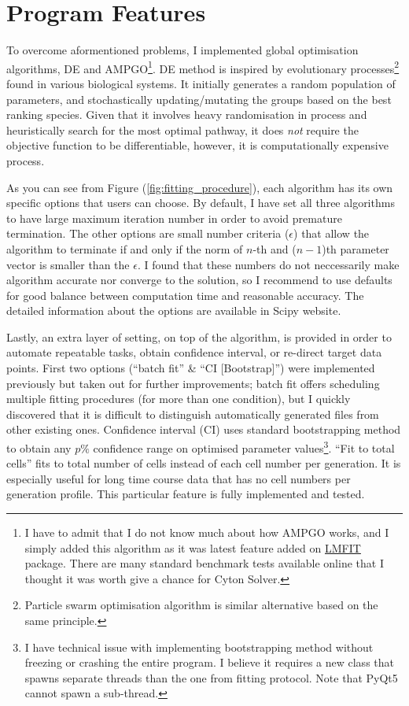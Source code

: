 \documentclass{article}
\newcommand{\enterProblemHeader}[1]{
    }
\newcommand{\exitProblemHeader}[1]{
    }
\newcounter{homeworkProblemCounter} %
\newcommand{\homeworkProblemName}{}
\newenvironment{homeworkProblem}[1][Problem \arabic{homeworkProblemCounter}]{ %
    \stepcounter{homeworkProblemCounter} %
    \renewcommand{\homeworkProblemName}{#1} %
    \section{\homeworkProblemName} %
    \enterProblemHeader{\homeworkProblemName} %
    }{
    \exitProblemHeader{\homeworkProblemName} %
    }
\begin{document}
\begin{homeworkProblem}[Program Features]
        To overcome aformentioned problems, I implemented global optimisation algorithms, DE and AMPGO\footnote{I have to admit that I do not know much about how AMPGO works, and I simply added this algorithm as it was latest feature added on \href{https://lmfit.github.io/lmfit-py/}{LMFIT} package. There are many standard benchmark tests available online that I thought it was worth give a chance for Cyton Solver.}. DE method is inspired by evolutionary processes\footnote{Particle swarm optimisation algorithm is similar alternative based on the same principle.} found in various biological systems. It initially generates a random population of parameters, and stochastically updating/mutating the groups based on the best ranking species. Given that it involves heavy randomisation in process and heuristically search for the most optimal pathway, it does \textit{not} require the objective function to be differentiable, however, it is computationally expensive process.

        As you can see from Figure (\ref{fig:fitting_procedure}), each algorithm has its own specific options that users can choose. By default, I have set all three algorithms to have large maximum iteration number in order to avoid premature termination. The other options are small number criteria ($\epsilon$) that allow the algorithm to terminate if and only if the norm of $n$-th and ($n-1$)th parameter vector is smaller than the $\epsilon$. I found that these numbers do not neccessarily make algorithm accurate nor converge to the solution, so I recommend to use defaults for good balance between computation time and reasonable accuracy. The detailed information about the options are available in Scipy website.

        Lastly, an extra layer of setting, on top of the algorithm, is provided in order to automate repeatable tasks, obtain confidence interval, or re-direct target data points. First two options (``batch fit'' \& ``CI [Bootstrap]'') were implemented previously but taken out for further improvements; batch fit offers scheduling multiple fitting procedures (for more than one condition), but I quickly discovered that it is difficult to distinguish automatically generated files from other existing ones. Confidence interval (CI) uses standard bootstrapping method to obtain any $p\%$ confidence range on optimised parameter values\footnote{I have technical issue with implementing bootstrapping method without freezing or crashing the entire program. I believe it requires a new class that spawns separate threads than the one from fitting protocol. Note that PyQt5 cannot spawn a sub-thread.}. ``Fit to total cells'' fits to total number of cells instead of each cell number per generation. It is especially useful for long time course data that has no cell numbers per generation profile. This particular feature is fully implemented and tested.


\end{homeworkProblem}
\end{document}
